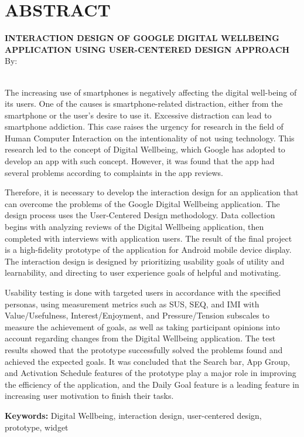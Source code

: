 \clearpage
\chapter*{ABSTRACT}

\begin{center}
  \textbf{\MakeUppercase{Interaction Design of Google Digital Wellbeing Application using User-Centered Design Approach}} \\[1em]
  
  By: \\
  \MakeUppercase{\theauthor} \\

\end{center}

\begin{singlespace}
  The increasing use of smartphones is negatively affecting the digital well-being of its users. One of the causes is smartphone-related distraction, either from the smartphone or the user's desire to use it. Excessive distraction can lead to smartphone addiction. This case raises the urgency for research in the field of Human Computer Interaction on the intentionality of not using technology. This research led to the concept of Digital Wellbeing, which Google has adopted to develop an app with such concept. However, it was found that the app had several problems according to complaints in the app reviews.

  Therefore, it is necessary to develop the interaction design for an application that can overcome the problems of the Google Digital Wellbeing application. The design process uses the User-Centered Design methodology. Data collection begins with analyzing reviews of the Digital Wellbeing application, then completed with interviews with application users. The result of the final project is a high-fidelity prototype of the application for Android mobile device display. The interaction design is designed by prioritizing usability goals of utility and learnability, and directing to user experience goals of helpful and motivating.

  Usability testing is done with targeted users in accordance with the specified personas, using measurement metrics such as SUS, SEQ, and IMI with Value/Usefulness, Interest/Enjoyment, and Pressure/Tension subscales to measure the achievement of goals, as well as taking participant opinions into account regarding changes from the Digital Wellbeing application. The test results showed that the prototype successfully solved the problems found and achieved the expected goals. It was concluded that the Search bar, App Group, and Activation Schedule features of the prototype play a major role in improving the efficiency of the application, and the Daily Goal feature is a leading feature in increasing user motivation to finish their tasks.

  \noindent \textbf{Keywords:} Digital Wellbeing, interaction design, user-centered design, prototype, widget

\end{singlespace}

